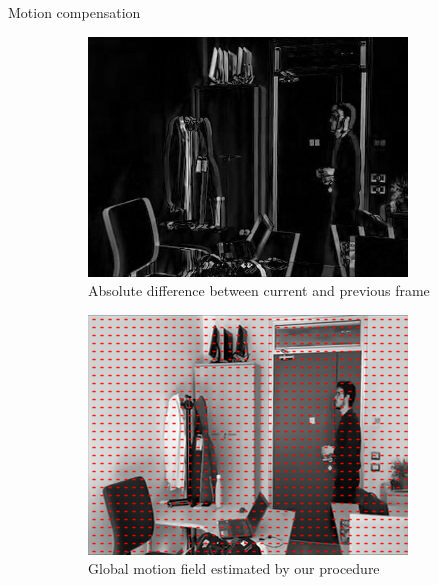 \documentclass[aspectratio=1610,xcolor=dvipsnames]{beamer}
\begin{document}
\begin{frame}{Motion compensation}
\begin{figure}[htbp]
        \begin{subfigure}[b]{0.3\textwidth}
            \centering
            \includegraphics[width=.9\textwidth]{images/pan240-diff-curr-prev-1.png}
            \caption{Absolute difference between current and previous frame}
            \label{fig:pan240-diff-curr-prev}
        \end{subfigure}
        \hfill
        \begin{subfigure}[b]{0.3\textwidth}
            \includegraphics[width=.9\textwidth]{images/pan240-camera-motion-1.png}
            \caption{Global motion field estimated by our procedure}
            \label{fig:pan240-est-mf}
        \end{subfigure}
        \hfill
        \begin{subfigure}[b]{0.3\textwidth}

\end{subfigure}
\end{figure}
\end{frame}
\end{document}

